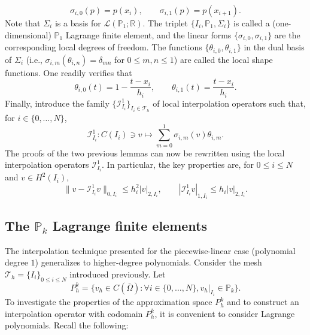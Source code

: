 \begin{equation*}
\sigma_{i,0}(p) = p(x_i),\qquad \sigma_{i,1}(p) = p(x_{i+1}).
\end{equation*}
Note that $\Sigma_i$ is a basis for $\mathcal{L}(\mathbb{P}_1; \mathbb{R})$. The triplet $\{I_i, \mathbb{P}_1, \Sigma_i\}$ is called a (one-dimensional) $\mathbb{P}_1$ Lagrange finite element, and the linear forms $\{\sigma_{i,0}, \sigma_{i,1}\}$ are the corresponding local degrees of freedom. The functions $\{\theta_{i,0}, \theta_{i,1}\}$ in the dual basis of $\Sigma_i$ (i.e., $\sigma_{i,m}(\theta_{i,n}) = \delta_{mn}$ for $0 \le m, n \le 1$) are called the local shape functions. One readily verifies that
\begin{equation*}
\theta_{i,0}(t) = 1 - \frac{t - x_i}{h_i},\qquad \theta_{i,1}(t) = \frac{t - x_i}{h_i}.
\end{equation*}
Finally, introduce the family $\{\mathcal{I}_{I_i}^1\}_{I_i \in \mathcal{T}_h}$ of local interpolation operators such that, for $i \in \{0, \dots, N\}$,
\begin{equation*}
\mathcal{I}_{I_i}^1: C(I_i) \ni v \mapsto \sum_{m=0}^1 \sigma_{i,m}(v) \theta_{i,m}.
\end{equation*}
The proofs of the two previous lemmas can now be rewritten using the local interpolation operators $\mathcal{I}_{I_i}^1$. In particular, the key properties are, for $0 \le i \le N$ and $v \in H^2(I_i)$,
\begin{equation*}
\|v - \mathcal{I}_{I_i}^1 v\|_{0,I_i} \le h_i^2 |v|_{2,I_i},\qquad|\mathcal{I}_{I_i}^1 v|_{1,I_i} \le h_i |v|_{2,I_i}.
\end{equation*}
\subsection{The $\mathbb{P}_k$ Lagrange finite elements}
The interpolation technique presented for the piecewise-linear case (polynomial degree $1$) generalizes to higher-degree polynomials. Consider the mesh $\mathcal{T}_h = \{I_i\}_{0 \le i \le N}$ introduced previously. Let
\begin{equation*}
P_h^k = \{ v_h \in C(\bar{\Omega}): \forall i \in \{0, \dots, N\}, v_h|_{I_i} \in \mathbb{P}_k \}.
\end{equation*}
To investigate the properties of the approximation space $P_h^k$ and to construct an interpolation operator with codomain $P_h^k$, it is convenient to consider Lagrange polynomials. Recall the following:

